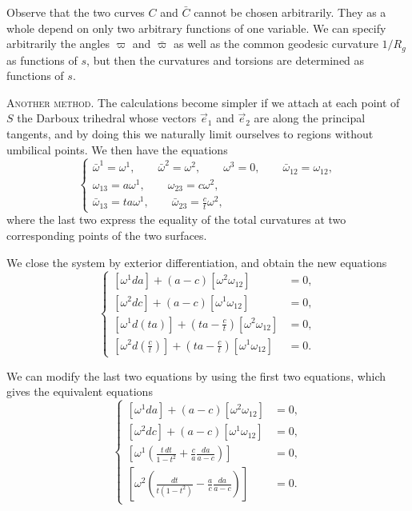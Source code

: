 \documentclass[leqno,11pt]{book}
\numberwithin{equation}{chapter}
\theoremstyle{shape1}
\theoremstyle{shape0}
\theoremstyle{shape2}
\theoremstyle{definition}
\begin{document}
Observe that the two curves $C$ and $\bar C$ cannot be chosen arbitrarily. They as a whole depend on only two arbitrary functions of one variable. We can specify arbitrarily the angles $\varpi$ and $\bar \varpi$ as well as the common geodesic curvature $1/R_{g}$ as functions of $s$, but then the curvatures and torsions are determined as functions of $s$.


\vspace{12pt}\fsec\textsc{Another method}. The calculations become simpler if we attach at each point of $S$ the Darboux trihedral whose vectors $\vec e_{1}$ and $\vec e_{2}$ are along the principal tangents, and by doing this we naturally limit ourselves to regions without umbilical points. We then have the equations
\begin{equation}
  \label{eq:7.VII.6}\tag{VII, 6}
  \left\{
    \begin{gathered}
      \bar\omega^{1}=\omega^{1},\qquad\bar\omega^{2}=\omega^{2},\qquad\omega^{3}=0,\qquad\bar\omega_{12}=\omega_{12},\\
      \omega_{13}=a\omega^{1},\qquad\omega_{23}=c\omega^{2},\\
      \bar\omega_{13}=ta\omega^{1},\qquad\bar\omega_{23}=\frac{c}{t}\omega^{2},
    \end{gathered}
  \right.
\end{equation}
where the last two express the equality of the total curvatures at two corresponding points of the two surfaces.

We close the system by exterior differentiation, and obtain the new equations
\begin{equation}
  \label{eq:7.VII.7}\tag{VII, 7}
  \left\{
    \begin{aligned}{}
      [\omega^{1}da]+(a-c)[\omega^{2}\omega_{12}]&=0,\\
      [\omega^{2}dc]+(a-c)[\omega^{1}\omega_{12}]&=0,\\
      [\omega^{1}d(ta)]+\left(ta-\frac{c}{t}\right)[\omega^{2}\omega_{12}]&=0,\\
      \left[\omega^{2}d\left(\frac{c}{t}\right)\right]+\left(ta-\frac{c}{t}\right)[\omega^{1}\omega_{12}]&=0.
    \end{aligned}
  \right.
\end{equation}

We can modify the last two equations by using the first two equations, which gives the equivalent equations
\begin{equation}
  \label{eq:7.VII.7'}\tag{VII, 7$'$}
  \left\{
    \begin{aligned}{}
      [\omega^{1}da]+(a-c)[\omega^{2}\omega_{12}]&=0,\\
      [\omega^{2}dc]+(a-c)[\omega^{1}\omega_{12}]&=0,\\
      \left[\omega^{1}\left(\frac{t\,dt}{1-t^{2}}+\frac{c}{a}\frac{da}{a-c}\right)\right]&=0,\\
      \left[\omega^{2}\left(\frac{dt}{t(1-t^{2})}-\frac{a}{c}\frac{da}{a-c}\right)\right]&=0.
    \end{aligned}
  \right.
\end{equation}
\end{document}

